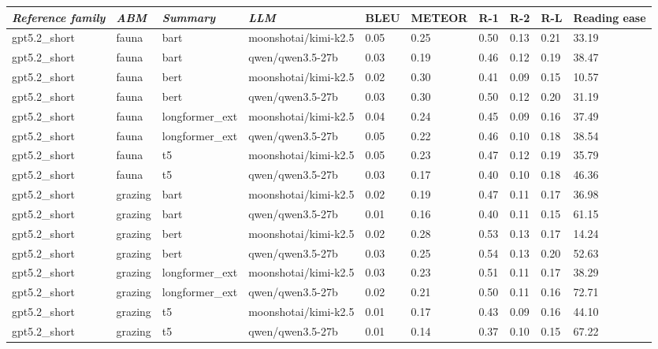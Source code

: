 \begin{tabular}{|l|l|l|l|l|l|l|l|l|l|}
\hline
\textit{\textbf{Reference family}} & \textit{\textbf{ABM}} & \textit{\textbf{Summary}} & \textit{\textbf{LLM}} & BLEU & METEOR & R-1 & R-2 & R-L & Reading ease \\
 \hline
 gpt5.2\_short & fauna & bart & moonshotai/kimi-k2.5 & 0.05 & 0.25 & 0.50 & 0.13 & 0.21 & 33.19 \\
 \hline
 gpt5.2\_short & fauna & bart & qwen/qwen3.5-27b & 0.03 & 0.19 & 0.46 & 0.12 & 0.19 & 38.47 \\
 \hline
 gpt5.2\_short & fauna & bert & moonshotai/kimi-k2.5 & 0.02 & 0.30 & 0.41 & 0.09 & 0.15 & 10.57 \\
 \hline
 gpt5.2\_short & fauna & bert & qwen/qwen3.5-27b & 0.03 & 0.30 & 0.50 & 0.12 & 0.20 & 31.19 \\
 \hline
 gpt5.2\_short & fauna & longformer\_ext & moonshotai/kimi-k2.5 & 0.04 & 0.24 & 0.45 & 0.09 & 0.16 & 37.49 \\
 \hline
 gpt5.2\_short & fauna & longformer\_ext & qwen/qwen3.5-27b & 0.05 & 0.22 & 0.46 & 0.10 & 0.18 & 38.54 \\
 \hline
 gpt5.2\_short & fauna & t5 & moonshotai/kimi-k2.5 & 0.05 & 0.23 & 0.47 & 0.12 & 0.19 & 35.79 \\
 \hline
 gpt5.2\_short & fauna & t5 & qwen/qwen3.5-27b & 0.03 & 0.17 & 0.40 & 0.10 & 0.18 & 46.36 \\
 \hline
 gpt5.2\_short & grazing & bart & moonshotai/kimi-k2.5 & 0.02 & 0.19 & 0.47 & 0.11 & 0.17 & 36.98 \\
 \hline
 gpt5.2\_short & grazing & bart & qwen/qwen3.5-27b & 0.01 & 0.16 & 0.40 & 0.11 & 0.15 & 61.15 \\
 \hline
 gpt5.2\_short & grazing & bert & moonshotai/kimi-k2.5 & 0.02 & 0.28 & 0.53 & 0.13 & 0.17 & 14.24 \\
 \hline
 gpt5.2\_short & grazing & bert & qwen/qwen3.5-27b & 0.03 & 0.25 & 0.54 & 0.13 & 0.20 & 52.63 \\
 \hline
 gpt5.2\_short & grazing & longformer\_ext & moonshotai/kimi-k2.5 & 0.03 & 0.23 & 0.51 & 0.11 & 0.17 & 38.29 \\
 \hline
 gpt5.2\_short & grazing & longformer\_ext & qwen/qwen3.5-27b & 0.02 & 0.21 & 0.50 & 0.11 & 0.16 & 72.71 \\
 \hline
 gpt5.2\_short & grazing & t5 & moonshotai/kimi-k2.5 & 0.01 & 0.17 & 0.43 & 0.09 & 0.16 & 44.10 \\
 \hline
 gpt5.2\_short & grazing & t5 & qwen/qwen3.5-27b & 0.01 & 0.14 & 0.37 & 0.10 & 0.15 & 67.22 \\

\end{tabular}
